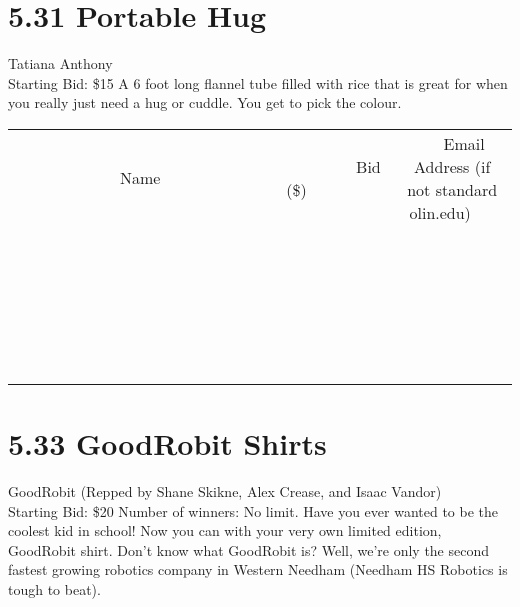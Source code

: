 \documentclass[11pt]{article}
\begin{document}
\section*{5.31 Portable Hug}
Tatiana Anthony
\\
Starting Bid: \$15
\newline
A 6 foot long flannel tube filled with rice that is great for when you really just need a hug or cuddle. You get to pick the colour.
\\[6ex]
\begin{tabular}{c c c}
~~~~~~~~~~~~~Name~~~~~~~~~~~~~ & ~~~~~~~~~Bid (\$)~~~~~~~~~  & ~~~Email Address (if not standard olin.edu)~~~\\
 & & \\
\hline
 & & \\
\hline
 & & \\
\hline
 & & \\
\hline
 & & \\
\hline
 & & \\
\hline
 & & \\
\hline
 & & \\
\hline
 & & \\
\hline
 & & \\
\hline
 & & \\
\hline
 & & \\
\hline
 & & \\
\hline
 & & \\
\hline
 & & \\
\hline
 & & \\
\hline
 & & \\
\hline
 & & \\
\hline
 & & \\
\hline
 & & \\
\hline
 & & \\
\hline
 & & \\
\hline
 & & \\
\hline
 & & \\
\hline
 & & \\
\hline
 & & \\
\hline
\end{tabular}
\newpage
\section*{5.33 GoodRobit Shirts}
GoodRobit (Repped by Shane Skikne, Alex Crease, and Isaac Vandor)
\\
Starting Bid: \$20
\newline
Number of winners: No limit.
\newline
Have you ever wanted to be the coolest kid in school! Now you can with your very own limited edition, GoodRobit shirt. Don't know what GoodRobit is? Well, we're only the second fastest growing robotics company in Western Needham (Needham HS Robotics is tough to beat).
\end{document}
